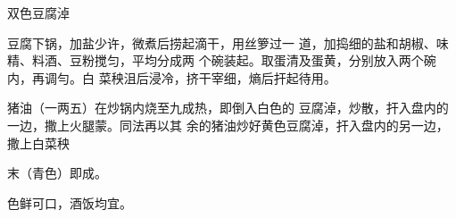 \begin{recipe}[鸳鸯豆腐淖]{双色豆腐淖}

\ingredients


\cooking

\step 	豆腐下锅，加盐少许，微煮后捞起滴干，用丝箩过一 道，加捣细的盐和胡椒、味精、料酒、豆粉搅匀，平均分成两 个碗装起。取蛋清及蛋黄，分别放入两个碗内，再调勻。白 菜秧沮后浸冷，挤干宰细，熵后扞起待用。

\step 	猪油（一两五）在炒锅内烧至九成热，即倒入白色的 豆腐淖，炒散，扞入盘内的一边，撒上火腿蒙。同法再以其 余的猪油炒好黄色豆腐淖，扞入盘内的另一边，撒上白菜秧

末（青色）即成。

\notes

色鲜可口，酒饭均宜。

\end{recipe}

